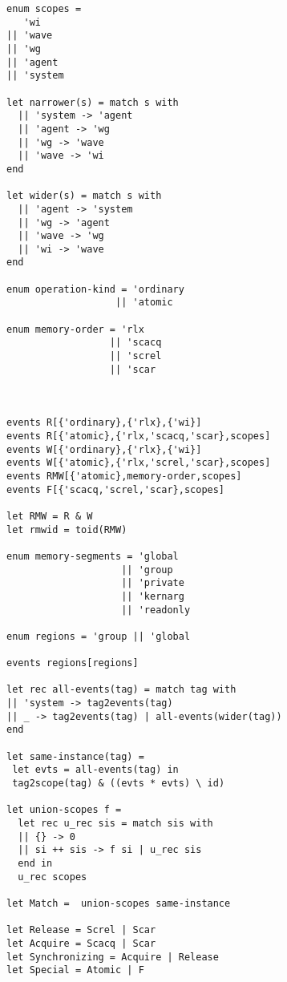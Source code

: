 \documentclass[a4paper]{article}
\begin{document}
\begin{verbatim}
enum scopes =
   'wi
|| 'wave
|| 'wg
|| 'agent
|| 'system

let narrower(s) = match s with
  || 'system -> 'agent
  || 'agent -> 'wg
  || 'wg -> 'wave
  || 'wave -> 'wi
end

let wider(s) = match s with
  || 'agent -> 'system
  || 'wg -> 'agent
  || 'wave -> 'wg
  || 'wi -> 'wave
end

enum operation-kind = 'ordinary
                   || 'atomic

enum memory-order = 'rlx
                  || 'scacq
                  || 'screl
                  || 'scar



events R[{'ordinary},{'rlx},{'wi}]
events R[{'atomic},{'rlx,'scacq,'scar},scopes]
events W[{'ordinary},{'rlx},{'wi}]
events W[{'atomic},{'rlx,'screl,'scar},scopes]
events RMW[{'atomic},memory-order,scopes]
events F[{'scacq,'screl,'scar},scopes]

let RMW = R & W
let rmwid = toid(RMW)

enum memory-segments = 'global
                    || 'group
                    || 'private
                    || 'kernarg
                    || 'readonly

enum regions = 'group || 'global

events regions[regions]

let rec all-events(tag) = match tag with
|| 'system -> tag2events(tag)
|| _ -> tag2events(tag) | all-events(wider(tag))
end

let same-instance(tag) =
 let evts = all-events(tag) in
 tag2scope(tag) & ((evts * evts) \ id)

let union-scopes f =
  let rec u_rec sis = match sis with
  || {} -> 0
  || si ++ sis -> f si | u_rec sis
  end in
  u_rec scopes

let Match =  union-scopes same-instance

let Release = Screl | Scar
let Acquire = Scacq | Scar
let Synchronizing = Acquire | Release
let Special = Atomic | F
\end{verbatim}

\clearpage

 
\end{document}
